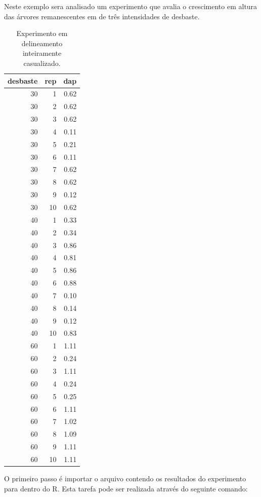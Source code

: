 \documentclass[
]{article}
\begin{document}
Neste exemplo sera analisado um experimento que avalia o crescimento em altura das árvores remanescentes em de três intensidades de desbaste.

\begin{table}

\caption{\label{tab:unnamed-chunk-174}Experimento em delineamento inteiramente casualizado.}
\centering
\begin{tabular}[t]{r|r|r}
\hline
desbaste & rep & dap\\
\hline
30 & 1 & 0.62\\
\hline
30 & 2 & 0.62\\
\hline
30 & 3 & 0.62\\
\hline
30 & 4 & 0.11\\
\hline
30 & 5 & 0.21\\
\hline
30 & 6 & 0.11\\
\hline
30 & 7 & 0.62\\
\hline
30 & 8 & 0.62\\
\hline
30 & 9 & 0.12\\
\hline
30 & 10 & 0.62\\
\hline
40 & 1 & 0.33\\
\hline
40 & 2 & 0.34\\
\hline
40 & 3 & 0.86\\
\hline
40 & 4 & 0.81\\
\hline
40 & 5 & 0.86\\
\hline
40 & 6 & 0.88\\
\hline
40 & 7 & 0.10\\
\hline
40 & 8 & 0.14\\
\hline
40 & 9 & 0.12\\
\hline
40 & 10 & 0.83\\
\hline
60 & 1 & 1.11\\
\hline
60 & 2 & 0.24\\
\hline
60 & 3 & 1.11\\
\hline
60 & 4 & 0.24\\
\hline
60 & 5 & 0.25\\
\hline
60 & 6 & 1.11\\
\hline
60 & 7 & 1.02\\
\hline
60 & 8 & 1.09\\
\hline
60 & 9 & 1.11\\
\hline
60 & 10 & 1.11\\
\hline
\end{tabular}
\end{table}

O primeiro passo é importar o arquivo contendo os resultados do experimento para dentro do R. Esta tarefa pode ser realizada através do seguinte comando:
\end{document}
